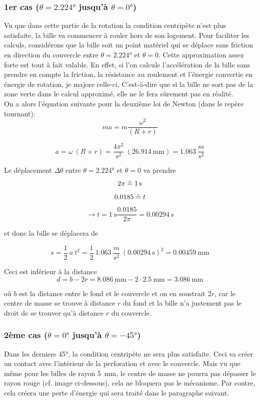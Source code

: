 \subsubsection{1er cas ($\theta = \ang{2.224}$ jusqu'à $\theta = \ang{0}$)}

Vu que dans cette partie de la rotation la condition centripète n'est plus satisfaite, la bille va commencer à rouler hors de son logement. Pour faciliter les calculs, considérons que la bille soit un point matériel qui se déplace sans friction en direction du couvercle entre $\theta = \ang{2.224}$ et $\theta = 0$. 
Cette approximation assez forte est tout à fait valable. En effet, si l'on calcule l'accélération de la bille sans prendre en compte la friction, la résistance au roulement et l'énergie convertie en énergie de rotation, je majore celle-ci. C'est-à-dire que si la bille ne sort pas de la zone verte dans le calcul approximé, elle ne le fera sûrement pas en réalité.\\

On a alors l'équation suivante pour la deuxième loi de Newton (dans le repère tournant):
\[ma = m \frac{\omega^{2}}{(R + r)}\]

\[a = \omega \ (R + r) = \frac{4 \pi^{2}}{s^{2}} \ (\SI{26.914}{\milli\metre}) = 1.063 \ \frac{m}{s^{2}}\]

Le déplacement $\Delta\theta$ entre $\theta =\ang{2.224}$ et $\theta = 0$ va prendre
\[2 \pi \estimates \SI{1}{\s}\]
\[0.0185 \mathrel{\hat{=}} t \]
\[\rightarrow t = \SI{1}{\s} \frac{0.0185}{2 \pi} = \SI{0.00294}{\second}\]

et donc la bille se déplacera de 

\[s = \frac{1}{2} \ a \ t^{2} = \frac{1}{2} \ 1.063 \ \frac{m}{s^{2}} \ (\SI{0.00294}{\s})^{2} = \SI{0.00459}{\milli\metre}\]

Ceci est inférieur à la distance 
\[d = b - 2r = \SI{8.086}{\milli\metre} - 2 \cdot \SI{2.5}{\milli\metre} = \SI{3.086}{\milli\metre}\]

où $b$ est la distance entre le fond et le couvercle et on en soustrait $2r$, car le centre de masse se trouve à distance $r$ du fond et la bille n'a justement pas le droit de se trouver qu'à distance $r$ du couvercle.

\subsubsection{2ème cas ($\theta = \ang{0}$ jusqu'à $\theta = \ang{-45}$)}
Dans les derniers \ang{45}, la condition centripète ne sera plus satisfaite. Ceci va créer un contact avec l'intérieur de la perforation et avec le couvercle. Mais vu que même pour les billes de rayon \SI{5}{\milli\metre}, le centre de masse ne pourra pas dépasser le rayon rouge (cf. image ci-dessous), cela ne bloquera pas le mécanisme.
Par contre, cela créera une perte d'énergie qui sera traité dans le paragraphe suivant.

